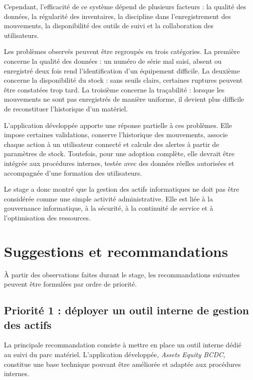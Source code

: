 \documentclass[12pt,a4paper]{report}
\begin{document}
Cependant, l'efficacité de ce système dépend de plusieurs facteurs : la qualité des données, la régularité des inventaires, la discipline dans l'enregistrement des mouvements, la disponibilité des outils de suivi et la collaboration des utilisateurs.

Les problèmes observés peuvent être regroupés en trois catégories. La première concerne la qualité des données : un numéro de série mal saisi, absent ou enregistré deux fois rend l'identification d'un équipement difficile. La deuxième concerne la disponibilité du stock : sans seuils clairs, certaines ruptures peuvent être constatées trop tard. La troisième concerne la traçabilité : lorsque les mouvements ne sont pas enregistrés de manière uniforme, il devient plus difficile de reconstituer l'historique d'un matériel.

L'application développée apporte une réponse partielle à ces problèmes. Elle impose certaines validations, conserve l'historique des mouvements, associe chaque action à un utilisateur connecté et calcule des alertes à partir de paramètres de stock. Toutefois, pour une adoption complète, elle devrait être intégrée aux procédures internes, testée avec des données réelles autorisées et accompagnée d'une formation des utilisateurs.

Le stage a donc montré que la gestion des actifs informatiques ne doit pas être considérée comme une simple activité administrative. Elle est liée à la gouvernance informatique, à la sécurité, à la continuité de service et à l'optimisation des ressources.

\section{Suggestions et recommandations}

À partir des observations faites durant le stage, les recommandations suivantes peuvent être formulées par ordre de priorité.

\subsection{Priorité 1 : déployer un outil interne de gestion des actifs}

La principale recommandation consiste à mettre en place un outil interne dédié au suivi du parc matériel. L'application développée, \textit{Assets Equity BCDC}, constitue une base technique pouvant être améliorée et adaptée aux procédures internes.
\end{document}
